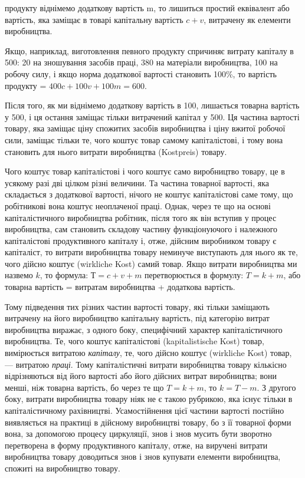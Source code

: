 \parcont{}  %
продукту віднімемо додаткову вартість m, то лишиться простий
еквівалент або вартість, яка заміщає в товарі капітальну вартість
$c + v$, витрачену як елементи виробництва.

Якщо, наприклад, виготовлення певного продукту спричиняє
витрату капіталу в 500: 20 на
зношування засобів праці, 380 на матеріали
виробництва, 100 на робочу силу, і якщо норма
додаткової вартості становить 100\%, то вартість продукту =
$400 c + 100 v + 100 m = 600$.

Після того, як ми віднімемо додаткову вартість в 100, лишається товарна вартість у 500,
і ця остання заміщає тільки витрачений капітал у 500. Ця частина вартості товару, яка заміщає ціну спожитих
засобів виробництва і ціну вжитої робочої сили, заміщає
тільки те, чого коштує товар самому капіталістові, і тому вона
становить для нього витрати виробництва (Kostpreis) товару.

Чого коштує товар капіталістові і чого коштує само виробництво
товару, це в усякому разі дві цілком різні величини. Та
частина товарної вартості, яка складається з додаткової вартості,
нічого не коштує капіталістові саме тому, що робітникові
вона коштує неоплаченої праці. Однак, через те що на основі
капіталістичного виробництва робітник, після того як він вступив
у процес виробництва, сам становить складову частину
функціонуючого і належного капіталістові продуктивного капіталу
і, отже, дійсним виробником товару є капіталіст, то витрати
виробництва товару неминуче виступають для нього як
те, чого дійсно коштує (wirkliche Kost) самий товар. Якщо витрати
виробництва ми назвемо $k$, то формула: $Т = c + v + m$
перетворюється в формулу: $T = k + m$, або товарна вартість =
витратам виробництва + додаткова вартість.

Тому підведення тих різних частин вартості товару, які тільки
заміщають витрачену на його виробництво капітальну вартість,
під категорію витрат виробництва виражає, з одного боку, специфічний
характер капіталістичного виробництва. Те, чого коштує
капіталістові (kapitalistische Kost) товар, вимірюється витратою
\emph{капіталу}, те, чого дійсно коштує (wirkliche Kost) товар, —
витратою \emph{праці}. Тому капіталістичні витрати виробництва товару
кількісно відрізняються від його вартості або його дійсних
витрат виробництва; вони менші, ніж товарна вартість, бо через
те що $T = k + m$, то $k = T - m$. З другого боку, витрати
виробництва товару ніяк не є такою рубрикою, яка існує тільки
в капіталістичному рахівництві. Усамостійнення цієї частини вартості
постійно виявляється на практиці в дійсному виробництві
товару, бо з її товарної форми вона, за допомогою процесу
циркуляції, знов і знов мусить бути зворотно перетворена
в форму продуктивного капіталу, отже, на виручені витрати виробництва
товару доводиться знов і знов купувати елементи
виробництва, спожиті на виробництво товару.
